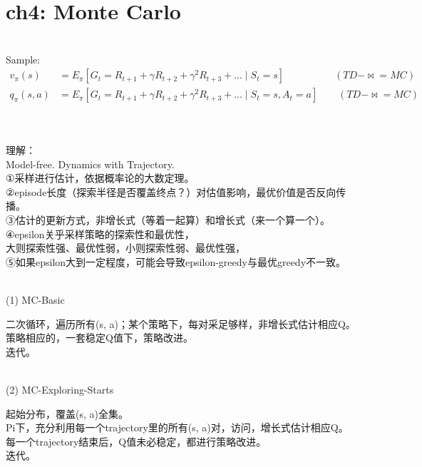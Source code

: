 \documentclass{article}
\begin{document}
\newpage
\section*{ch4: Monte Carlo}


~ \\[3pt]
Sample: 
\begin{align*}
    v_{\pi}(s) 
      &= E_{\pi} \left[ 
         G_{t} = R_{t+1} + \gamma R_{t+2} + \gamma^2 R_{t+3} + ... 
         \mid S_{t}=s \right] 
         \qquad \qquad \quad (TD-\Join =MC) \\[3pt]
    q_{\pi}(s, a) 
      &= E_{\pi} \left[ 
         G_{t} = R_{t+1} + \gamma R_{t+2} + \gamma^2 R_{t+3} + ... 
         \mid S_{t}=s, A_{t}=a \right] 
         \qquad (TD-\Join =MC) \\[3pt]
\end{align*}


~ \\[3pt]
\begin{CJK}{UTF8}{gbsn}
    理解： \\[3pt]
    Model-free. Dynamics with Trajectory. \\[3pt]
    ①采样进行估计，依据概率论的大数定理。 \\[3pt]
    ②episode长度（探索半径是否覆盖终点？）对估值影响，最优价值是否反向传播。 \\[3pt]
    ③估计的更新方式，非增长式（等着一起算）和增长式（来一个算一个）。 \\[3pt]
    ④epsilon关乎采样策略的探索性和最优性， \\[3pt]
    大则探索性强、最优性弱，小则探索性弱、最优性强， \\[3pt]
    ⑤如果epsilon大到一定程度，可能会导致epsilon-greedy与最优greedy不一致。 \\[3pt]
\end{CJK}


~ \\[3pt]
(1) MC-Basic 
~ \\[3pt]
\begin{CJK}{UTF8}{gbsn}
    二次循环，遍历所有(s, a)；某个策略下，每对采足够样，非增长式估计相应Q。 \\[3pt]
    策略相应的，一套稳定Q值下，策略改进。 \\[3pt]
    迭代。 \\[3pt]
\end{CJK}


~ \\[3pt]
(2) MC-Exploring-Starts 
~ \\[3pt]
\begin{CJK}{UTF8}{gbsn}
    起始分布，覆盖(s, a)全集。 \\[3pt]
    Pi下，充分利用每一个trajectory里的所有(s, a)对，访问，增长式估计相应Q。 \\[3pt]
    每一个trajectory结束后，Q值未必稳定，都进行策略改进。 \\[3pt]
    迭代。 \\[3pt]
\end{CJK}
\end{document}

